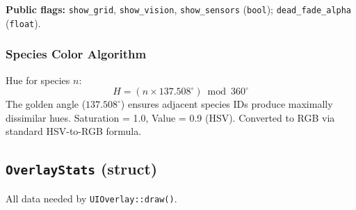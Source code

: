 \textbf{Public flags:} \texttt{show\_grid}, \texttt{show\_vision}, \texttt{show\_sensors}
(\texttt{bool}); \texttt{dead\_fade\_alpha} (\texttt{float}).

\subsubsection{Species Color Algorithm}

Hue for species $n$:
\[
  H = (n \times 137.508^\circ) \bmod 360^\circ
\]
The golden angle ($137.508^\circ$) ensures adjacent species IDs produce maximally
dissimilar hues.  Saturation = 1.0, Value = 0.9 (HSV).  Converted to RGB via standard
HSV-to-RGB formula.

\subsection{\texttt{OverlayStats} (struct)}

All data needed by \texttt{UIOverlay::draw()}.

